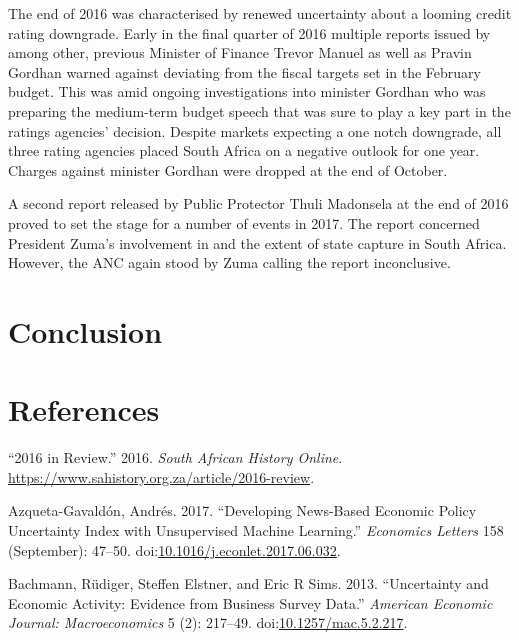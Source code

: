 \documentclass[11pt,preprint, authoryear]{elsarticle}
\numberwithin{equation}{section}
\numberwithin{figure}{section}
\numberwithin{table}{section}
\begin{document}
The end of 2016 was characterised by renewed uncertainty about a looming
credit rating downgrade. Early in the final quarter of 2016 multiple
reports issued by among other, previous Minister of Finance Trevor
Manuel as well as Pravin Gordhan warned against deviating from the
fiscal targets set in the February budget. This was amid ongoing
investigations into minister Gordhan who was preparing the medium-term
budget speech that was sure to play a key part in the ratings agencies'
decision. Despite markets expecting a one notch downgrade, all three
rating agencies placed South Africa on a negative outlook for one year.
Charges against minister Gordhan were dropped at the end of October.

A second report released by Public Protector Thuli Madonsela at the end
of 2016 proved to set the stage for a number of events in 2017. The
report concerned President Zuma's involvement in and the extent of state
capture in South Africa. However, the ANC again stood by Zuma calling
the report inconclusive.

\section{\texorpdfstring{Conclusion
\label{sec_conclude}}{Conclusion }}\label{conclusion}

\newpage

\section*{References}\label{references}

\hypertarget{refs}{}
\hypertarget{ref-2016}{}
``2016 in Review.'' 2016. \emph{South African History Online}.
\url{https://www.sahistory.org.za/article/2016-review}.

\hypertarget{ref-Azqueta-Gavaldon2017}{}
Azqueta-Gavaldón, Andrés. 2017. ``Developing News-Based Economic Policy
Uncertainty Index with Unsupervised Machine Learning.'' \emph{Economics
Letters} 158 (September): 47--50.
doi:\href{https://doi.org/10.1016/j.econlet.2017.06.032}{10.1016/j.econlet.2017.06.032}.

\hypertarget{ref-Bachmann2013}{}
Bachmann, Rüdiger, Steffen Elstner, and Eric R Sims. 2013. ``Uncertainty
and Economic Activity: Evidence from Business Survey Data.''
\emph{American Economic Journal: Macroeconomics} 5 (2): 217--49.
doi:\href{https://doi.org/10.1257/mac.5.2.217}{10.1257/mac.5.2.217}.
\end{document}
